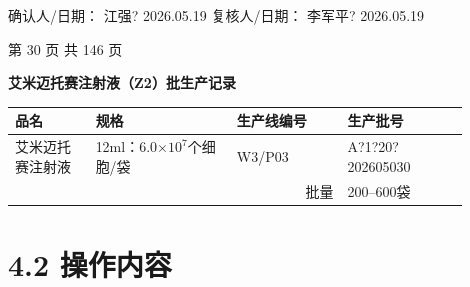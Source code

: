 \documentclass[UTF8,10pt,a4paper,fontset=fandol]{ctexart}
\newcommand{\fieldvalue}[1]{#1}
\newcommand{\handwritten}[1]{#1}
\begin{document}
确认人/日期：%
\fieldvalue{\handwritten{江强?}}
\quad
\fieldvalue{\handwritten{2026.05.19}}
\hfill
复核人/日期：%
\fieldvalue{\handwritten{李军平?}}
\quad
\fieldvalue{\handwritten{2026.05.19}}

\begin{center}
第 30 页 共 146 页
\end{center}

\newpage

\begin{center}
\textbf{艾米迈托赛注射液（Z2）批生产记录}
\end{center}

\noindent
\begin{tabular}{|p{0.16\linewidth}|p{0.28\linewidth}|p{0.22\linewidth}|p{0.24\linewidth}|}
\hline
品名 & 规格 & 生产线编号 & 生产批号 \\
\hline
艾米迈托赛注射液 & 12ml：6.0$\times 10^{7}$个细胞/袋 &
\fieldvalue{\handwritten{W3/P03}} &
\fieldvalue{\handwritten{A?1?20?202605030}} \\
\hline
\multicolumn{3}{r|}{批量} & 200--600袋 \\
\hline
\end{tabular}

\section*{4.2 操作内容}
\end{document}
